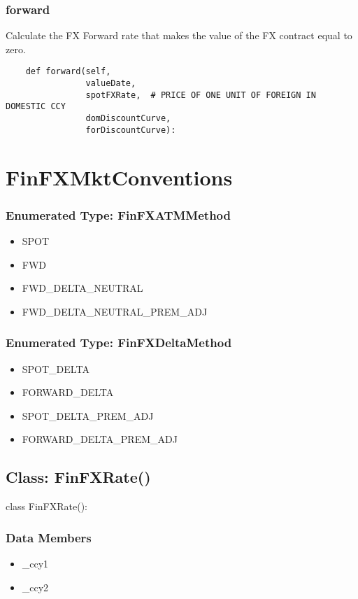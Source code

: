 \documentclass[twoside,11pt]{book}
\begin{document}
\subsubsection*{{\bf forward}}
Calculate the FX Forward rate that makes the value of the FX contract equal to zero.  

\begin{lstlisting}
    def forward(self,
                valueDate,
                spotFXRate,  # PRICE OF ONE UNIT OF FOREIGN IN DOMESTIC CCY
                domDiscountCurve,
                forDiscountCurve):
\end{lstlisting}

\newpage
\section{FinFXMktConventions}

\subsubsection{Enumerated Type: FinFXATMMethod}
\begin{itemize}
\item{SPOT}
\item{FWD}
\item{FWD\_DELTA\_NEUTRAL}
\item{FWD\_DELTA\_NEUTRAL\_PREM\_ADJ}
\end{itemize}

\subsubsection{Enumerated Type: FinFXDeltaMethod}
\begin{itemize}
\item{SPOT\_DELTA}
\item{FORWARD\_DELTA}
\item{SPOT\_DELTA\_PREM\_ADJ}
\item{FORWARD\_DELTA\_PREM\_ADJ}
\end{itemize}

\subsection*{Class: FinFXRate()}
class FinFXRate(): 

\subsubsection*{Data Members}
\begin{itemize}
\item{\_ccy1}
\item{\_ccy2}
\end{itemize}
\end{document}
